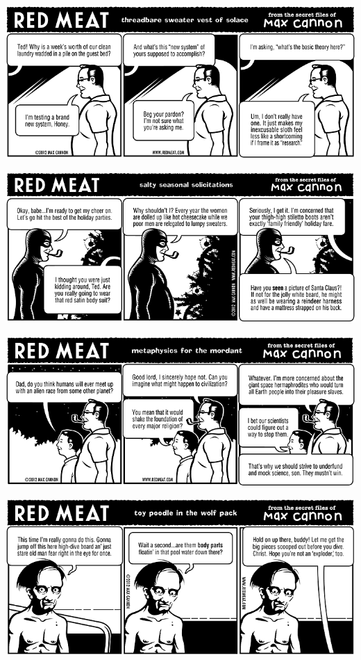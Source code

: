 \documentclass[a4paper,twoside,11pt]{article}
\begin{document}
\includegraphics[width=\textwidth]{redmeat_2012-12-11.png}



\includegraphics[width=\textwidth]{redmeat_2012-12-18.png}



\includegraphics[width=\textwidth]{redmeat_2012-12-25.png}



\includegraphics[width=\textwidth]{redmeat_2013-01-01.png}
\end{document}
